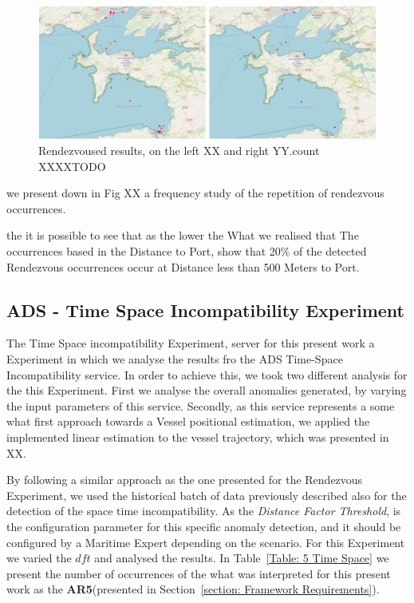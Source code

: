\begin{figure}[H]
	\centering
	\includegraphics[scale = .8]{figures/Ch5/ThesisExpRend.pdf}
    \caption{Rendezvoused results, on the left XX and right YY.count XXXXTODO}
    \label{fig: Chapter 5 Rend2Mapsr}
\end{figure}


we present down in Fig XX a frequency study of the repetition of rendezvous occurrences.

the it is possible to see that as the lower the 
What we realised that 
The occurrences based in the Distance to Port, show that 20\% of the detected Rendezvous occurrences occur at Distance less than 500 Meters to Port. 


\subsection{ADS - Time Space Incompatibility Experiment}
\label{subsection: ADS - Time Space Incompatibility Experiment}
The Time Space incompatibility Experiment, server for this present work a Experiment in which we analyse the results fro the ADS Time-Space Incompatibility service. In order to achieve this, we took two different analysis for the this Experiment. First we analyse the overall anomalies generated, by varying the input parameters of this service. Secondly, as this service represents a some what first approach towards a Vessel positional estimation, we applied the implemented linear estimation to the vessel trajectory, which was presented in XX.

By following a similar approach as the one presented for the Rendezvous Experiment, we used the historical batch of data previously described also for the detection of the space time incompatibility. As the \emph{Distance Factor Threshold}, is the configuration parameter for this specific anomaly detection, and it should be configured by a Maritime Expert depending on the scenario. For this Experiment we varied the $dft$ and analysed the results.  In Table~\ref{Table: 5 Time Space} we present the number of occurrences of the what was interpreted for this present work as the \textbf{AR5}(presented in Section~\ref{section: Framework Requirements}). 


